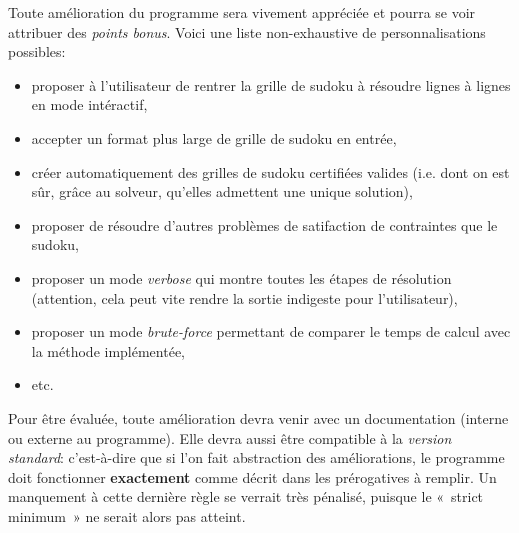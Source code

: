 \documentclass[french,a4paper]{article}
\theoremstyle{definition}
\theoremstyle{remark}
\begin{document}
Toute amélioration du programme sera vivement appréciée et pourra se
voir attribuer des {\em points bonus}. Voici une liste non-exhaustive
de personnalisations possibles:
\begin{itemize}
\item proposer à l'utilisateur de rentrer la grille de sudoku à
  résoudre lignes à lignes en mode intéractif,
\item accepter un format plus large de grille de sudoku en entrée,
\item créer automatiquement des grilles de sudoku certifiées valides
  (i.e. dont on est sûr, grâce au solveur, qu'elles admettent une
  unique solution),
\item proposer de résoudre d'autres problèmes de satifaction de
  contraintes que le sudoku,
\item proposer un mode {\em verbose} qui montre toutes les étapes de
  résolution (attention, cela peut vite rendre la sortie indigeste
  pour l'utilisateur),
\item proposer un mode {\em brute-force} permettant de comparer le
  temps de calcul avec la méthode implémentée,
\item etc.
\end{itemize}
Pour être évaluée, toute amélioration devra venir avec un
documentation (interne ou externe au programme). Elle devra aussi être
compatible à la {\em version standard}: c'est-à-dire que si l'on fait
abstraction des améliorations, le programme doit fonctionner {\bf
  exactement} comme décrit dans les prérogatives à remplir. Un
manquement à cette dernière règle se verrait très pénalisé, puisque le
«~strict minimum~» ne serait alors pas atteint.
\end{document}
